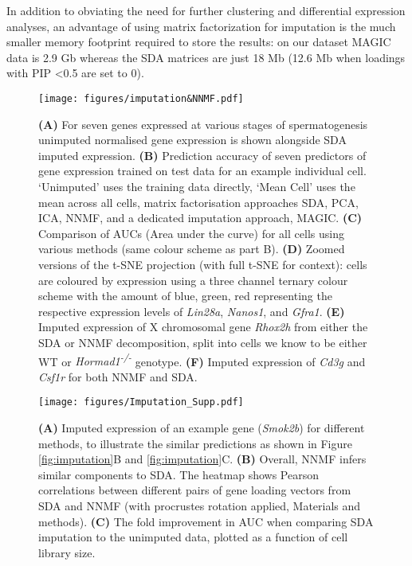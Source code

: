 In addition to obviating the need for further clustering and differential expression analyses, an advantage of using matrix factorization for imputation is the much smaller memory footprint required to store the results: on our dataset MAGIC data is 2.9 Gb whereas the SDA matrices are just 18 Mb (12.6 Mb when loadings with PIP <0.5 are set to 0).


\begin{figure}[H]
	\centering
	\texttt{[image: figures/imputation\&NNMF.pdf]}
	\caption{
		\textbf{(A)} For seven genes expressed at various stages of spermatogenesis unimputed normalised gene expression is shown alongside SDA imputed expression.
		\textbf{(B)} Prediction accuracy of seven predictors of gene expression trained on test data for an example individual cell. ‘Unimputed’ uses the training data directly, ‘Mean Cell’ uses the mean across all cells, matrix factorisation approaches SDA, PCA, ICA, NNMF, and a dedicated imputation approach, MAGIC.
		\textbf{(C)} Comparison of AUCs (Area under the curve) for all cells using various methods (same colour scheme as part B).
		\textbf{(D)} Zoomed versions of the t-SNE projection (with full t-SNE for context): cells are coloured by expression using a three channel ternary colour scheme with the amount of blue, green, red representing the respective expression levels of \textit{Lin28a}, \textit{Nanos1}, and \textit{Gfra1}.
		\textbf{(E)} Imputed expression of X chromosomal gene \textit{Rhox2h} from either the SDA or NNMF decomposition, split into cells we know to be either WT or \textit{Hormad1\textsuperscript{-/-}} genotype.
		\textbf{(F)} Imputed expression of \textit{Cd3g} and \textit{Csf1r} for both NNMF and SDA.}
	\label{fig:imputation_supp}
\end{figure}

\begin{figure}[H]
	\centering
	\texttt{[image: figures/Imputation\_Supp.pdf]}
	\caption{
		\textbf{(A)} Imputed expression of an example gene (\textit{Smok2b}) for different methods, to illustrate the similar predictions as shown in Figure \ref{fig:imputation}B and \ref{fig:imputation}C.
		\textbf{(B)} Overall, NNMF infers similar components to SDA. The heatmap shows Pearson correlations between different pairs of gene loading vectors from SDA and NNMF (with procrustes rotation applied, Materials and methods).
		\textbf{(C)} The fold improvement in AUC when comparing SDA imputation to the unimputed data, plotted as a function of cell library size.
	}
	\label{fig:imputation_supp}
\end{figure}

